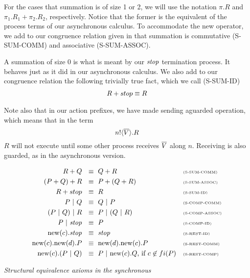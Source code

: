 For the cases that summation is of size 1 or 2, we will use the notation $\pi.R$ and $\pi_1.R_1 + \pi_2.R_2$, respectively.  Notice that the former is the equivalent of the process terms of our asynchronous calculus.
To accommodate the new operator, we add to our congruence relation given in  that summation is commutative (S-SUM-COMM) and associative (S-SUM-ASSOC).

A summation of size 0 is what is meant by our $\mbox{\emph{stop}}$ termination process.  
It behaves just as it did in our asynchronous calculus.
We also add to our congruence relation the following trivially true fact, which we call (S-SUM-ID)
\begin{align*}
	R + stop \equiv R
\end{align*}

Note also that in our action prefixes, we have made sending aguarded operation, which means that in the term
\[
	{n}!\langle{ \ensuremath{\overline{V}} }\rangle.R
\]
$R$ will not execute until some other process receives $\overline{V}$ along $n$.  
Receiving is also guarded, as in the asynchronous version.  

\begin{insettable}
\begin{center}
	\begin{align*}
		R + Q\ &\   \equiv\ Q + R && \text{\tiny{(S-SUM-COMM)}}\\
		(P + Q) + R\ &\   \equiv\ P + (Q + R) && \text{\tiny{(S-SUM-ASSOC)}}\\
		R + stop\ &\   \equiv\ R && \text{\tiny{(S-SUM-ID)}}\\
		P \ |\  Q\ &\  \equiv\  Q \ |\  P && \text{\tiny{(S-COMP-COMM)}}\\
	 	(P \ |\  Q) \ |\  R\ &\ \equiv\ P \ |\  (Q \ |\  R) && \text{\tiny{(S-COMP-ASSOC)}}\\
		P \ |\  \mbox{\emph{stop}}\ &\ \equiv\ P && \text{\tiny{(S-COMP-ID)}}\\
		\text{new}({c}). \mbox{\emph{stop}}\ &\ \equiv\ \mbox{\emph{stop}} && \text{\tiny{(S-REST-ID)}}\\
		\text{new}({c}).\text{new}({d}). P \ &\ \equiv\ \text{new}({d}).\text{new}({c}). P && \text{\tiny{(S-REST-COMM)}}\\
		\text{new}({c}).(P \ |\  Q)\ &\ \equiv\  P \ |\  \text{new}({c}).Q\text{, if } c\not\in fi(P) && \text{\tiny{(S-REST-COMP)}}
	\end{align*}
	\caption{\emph{Structural equivalence axioms in the synchronous \picalc}}\label{spicalcaxioms}
\end{center}\end{insettable}

